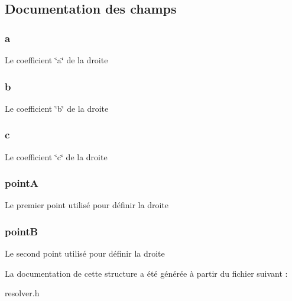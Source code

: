 \subsection{Documentation des champs}
\hypertarget{struct_line_a4124bc0a9335c27f086f24ba207a4912}{
\subsubsection[{a}]{\setlength{\rightskip}{0pt plus 5cm}a}}\label{struct_line_a4124bc0a9335c27f086f24ba207a4912}
Le coefficient \char`\"{}a\char`\"{} de la droite \hypertarget{struct_line_a21ad0bd836b90d08f4cf640b4c298e7c}{
\subsubsection[{b}]{\setlength{\rightskip}{0pt plus 5cm}b}}\label{struct_line_a21ad0bd836b90d08f4cf640b4c298e7c}
Le coefficient \char`\"{}b\char`\"{} de la droite \hypertarget{struct_line_ae0323a9039add2978bf5b49550572c7c}{
\subsubsection[{c}]{\setlength{\rightskip}{0pt plus 5cm}c}}\label{struct_line_ae0323a9039add2978bf5b49550572c7c}
Le coefficient \char`\"{}c\char`\"{} de la droite \hypertarget{struct_line_ae61338ee34dcba3435f5415e653cad2a}{
\subsubsection[{point\-A}]{\setlength{\rightskip}{0pt plus 5cm}point\-A}}\label{struct_line_ae61338ee34dcba3435f5415e653cad2a}
Le premier point utilisé pour définir la droite \hypertarget{struct_line_ac573310eb7acf2d7e112153d00a92695}{
\subsubsection[{point\-B}]{\setlength{\rightskip}{0pt plus 5cm}point\-B}}\label{struct_line_ac573310eb7acf2d7e112153d00a92695}
Le second point utilisé pour définir la droite 

La documentation de cette structure a été générée à partir du fichier suivant \-:\begin{DoxyCompactItemize}
\item 
resolver.\-h\end{DoxyCompactItemize}

